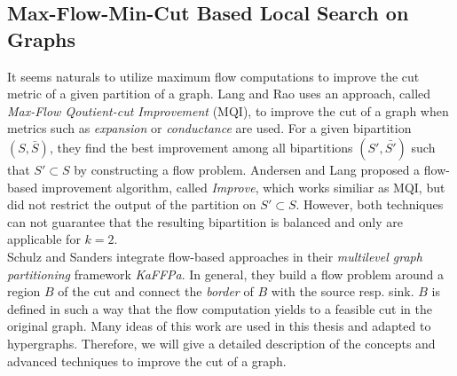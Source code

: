 
\subsection{Max-Flow-Min-Cut Based Local Search on Graphs}
\label{sec:flow_local_search_graph}

It seems naturals to utilize maximum flow computations to improve the cut metric of a 
given partition of a graph. Lang and Rao \cite{lang2004flow} uses an approach,
called \emph{Max-Flow Qoutient-cut Improvement} (MQI), to improve the cut
of a graph when metrics such as \emph{expansion} or \emph{conductance}
are used. For a given bipartition $(S,\bar{S})$, they find the best 
improvement among all bipartitions $(S',\bar{S'})$ such that $S' \subset S$
by constructing a flow problem. Andersen and Lang \cite{andersen2008algorithm}
proposed a flow-based improvement algorithm, called \emph{Improve},
which works similiar as MQI, but did not restrict the output of the 
partition on $S' \subset S$. However, both techniques can not guarantee 
that the resulting bipartition is balanced and only are applicable for $k=2$. \\
Schulz and Sanders \cite{sanders2011engineering} integrate flow-based approaches 
in their \emph{multilevel graph partitioning} framework \emph{KaFFPa}. In general,
they build a flow problem around a region $B$ of the cut and connect the \emph{border} 
of $B$ with the source resp. sink. $B$ is defined in such a way that the flow computation
yields to a feasible cut in the original graph. Many ideas of this work are used in this
thesis and adapted to hypergraphs. Therefore, we will give a detailed description
of the concepts and advanced techniques to improve the cut of a graph.


